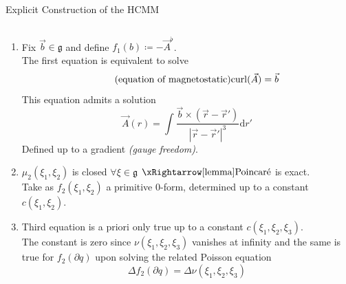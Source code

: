 \documentclass[handout,10pt]{beamer}
\begin{document}
  \begin{frame}[t]{Explicit Construction of the HCMM}
  	\begin{columns}
			\begin{column}[]{.5\linewidth}
 		 	\end{column}
			\begin{column}[]{.5\linewidth}
 		 	\end{column}
 	 \end{columns}

		\begin{enumerate}
			\item<1-> Fix $\vec{b} \in \mathfrak{g}$ and define $f_1(b) \coloneqq -\vec{A}^\flat$.\\ 
				The first equation is equivalent to solve
				\begin{displaymath}
					\tag{equation of magnetostatic}
					{\rm curl}(\vec{A})=\vec{b}
				\end{displaymath}
				This equation admits a solution 
				\begin{displaymath}
					\tag{Biot-Savart law}
					\vec{A}(r) = \int\frac{\vec{b}\times(\vec{r}-\vec{r}')}{|\vec{r}-\vec{r}'|^3}\textrm{d}r'
				\end{displaymath}							
				\alert {Defined up to a gradient \emph{(gauge freedom)}}. 
			\item<2-> $\mu_2(\xi_1,\xi_2)$ is closed $\forall \xi\in\mathfrak{g}$ $\xRightarrow[\text{lemma}]{\text{Poincar\'e}}$ is exact.\\
				Take as $f_2(\xi_1,\xi_2)$ a primitive $0$-form, \alert{determined up to a constant $c(\xi_1,\xi_2)$}.
			\item<3-> Third equation is a priori only true up to a constant $c(\xi_1, \xi_2, \xi_3)$.\\
				The constant is zero since $\nu(\xi_1, \xi_2, \xi_3)$ vanishes at infinity and 
				the same is true for $f_2(\partial q)$ upon solving the related Poisson equation
 				\begin{displaymath}
 			 		\Delta f_2(\partial q) = \Delta \nu(\xi_1, \xi_2, \xi_3)			
 				\end{displaymath}
		\end{enumerate}
  \end{frame}
\end{document}
